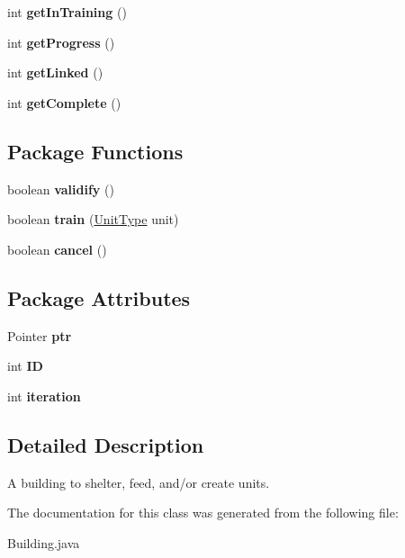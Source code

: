 \begin{CompactItemize}
\item 
\hypertarget{classBuilding_86e78c67cbc3218550b175c2a8954845}{
int \textbf{getInTraining} ()}
\label{classBuilding_86e78c67cbc3218550b175c2a8954845}

\item 
\hypertarget{classBuilding_5ce7ab40f4138247a799a197dddc5209}{
int \textbf{getProgress} ()}
\label{classBuilding_5ce7ab40f4138247a799a197dddc5209}

\item 
\hypertarget{classBuilding_8c97bfce86d3678c45999a620f4c0d96}{
int \textbf{getLinked} ()}
\label{classBuilding_8c97bfce86d3678c45999a620f4c0d96}

\item 
\hypertarget{classBuilding_e99952041bb8b3832609a46252406989}{
int \textbf{getComplete} ()}
\label{classBuilding_e99952041bb8b3832609a46252406989}

\end{CompactItemize}
\subsection*{Package Functions}
\begin{CompactItemize}
\item 
\hypertarget{classBuilding_07d6cee891a31ea6314763ce416e774f}{
boolean \textbf{validify} ()}
\label{classBuilding_07d6cee891a31ea6314763ce416e774f}

\item 
\hypertarget{classBuilding_dd956b0c3891f6f7a708d03f360ea78d}{
boolean \textbf{train} (\hyperlink{classUnitType}{UnitType} unit)}
\label{classBuilding_dd956b0c3891f6f7a708d03f360ea78d}

\item 
\hypertarget{classBuilding_e445fb3ceb3b359a9bbfffdf7f1982ab}{
boolean \textbf{cancel} ()}
\label{classBuilding_e445fb3ceb3b359a9bbfffdf7f1982ab}

\end{CompactItemize}
\subsection*{Package Attributes}
\begin{CompactItemize}
\item 
\hypertarget{classBuilding_57899d00333919397552519ef8299fd6}{
Pointer \textbf{ptr}}
\label{classBuilding_57899d00333919397552519ef8299fd6}

\item 
\hypertarget{classBuilding_44b3e8718773800e0d7fb464b19012b3}{
int \textbf{ID}}
\label{classBuilding_44b3e8718773800e0d7fb464b19012b3}

\item 
\hypertarget{classBuilding_28cb3992ff16427fbe5d84c61939d433}{
int \textbf{iteration}}
\label{classBuilding_28cb3992ff16427fbe5d84c61939d433}

\end{CompactItemize}


\subsection{Detailed Description}
A building to shelter, feed, and/or create units. 

The documentation for this class was generated from the following file:\begin{CompactItemize}
\item 
Building.java\end{CompactItemize}
